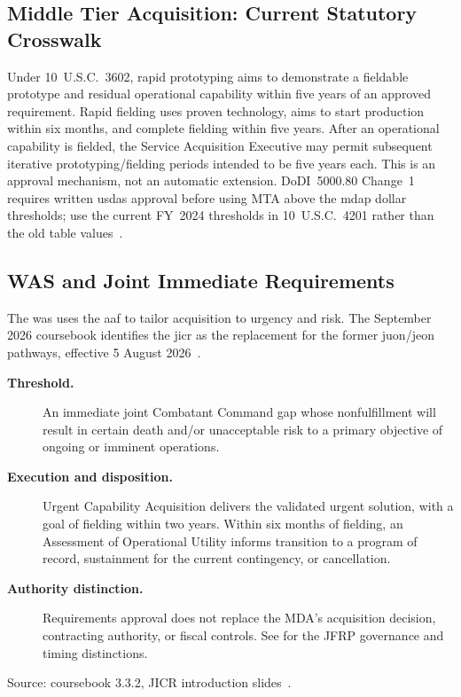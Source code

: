 \documentclass[../main.tex]{subfiles}
\begin{document}
\subsection{Middle Tier Acquisition: Current Statutory Crosswalk}
Under 10~U.S.C.\ 3602, rapid prototyping aims to demonstrate a fieldable prototype and residual operational capability within five years of an approved requirement. Rapid fielding uses proven technology, aims to start production within six months, and complete fielding within five years. After an operational capability is fielded, the Service Acquisition Executive may permit subsequent iterative prototyping/fielding periods intended to be five years each. This is an approval mechanism, not an automatic extension. DoDI~5000.80 Change~1 requires written \ac{usdas} approval before using MTA above the \ac{mdap} dollar thresholds; use the current FY~2024 thresholds in 10~U.S.C.\ 4201 rather than the old table values~\autocite{USC-10-3602,USC-10-4201-2026,DoDI5000-80}.

\subsection{WAS and Joint Immediate Requirements}
The \ac{was} uses the \ac{aaf} to tailor acquisition to urgency and risk. The September 2026 coursebook identifies the \ac{jicr} as the replacement for the former \ac{juon}/\ac{jeon} pathways, effective 5 August 2026~\autocite{edo-3-3-2-acq-milestones-phases-2025}.
\begin{description}
  \item[\textbf{Threshold.}] An immediate joint Combatant Command gap whose nonfulfillment will result in certain death and/or unacceptable risk to a primary objective of ongoing or imminent operations.
  \item[\textbf{Execution and disposition.}] Urgent Capability Acquisition delivers the validated urgent solution, with a goal of fielding within two years. Within six months of fielding, an Assessment of Operational Utility informs transition to a program of record, sustainment for the current contingency, or cancellation.
  \item[\textbf{Authority distinction.}] Requirements approval does not replace the MDA's acquisition decision, contracting authority, or fiscal controls. See \Sec{\ref{sec:jfrp}} for the JFRP governance and timing distinctions.
\end{description}
\noindent Source: coursebook 3.3.2, JICR introduction slides~\autocite{edo-3-3-2-acq-milestones-phases-2025}.
\end{document}
